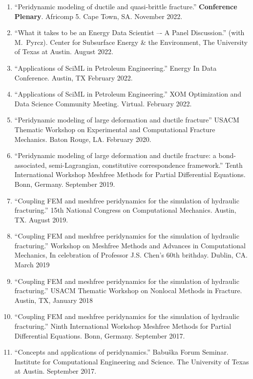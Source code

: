 \else
%
\ifdefined\ispdf
\begin{etaremune}
\else
\begin{enumerate}
\fi
    \item ``Peridynamic modeling of ductile and quasi-brittle fracture.''  {\bf Conference Plenary}. Africomp 5. Cape Town, SA.  November 2022.
    \item ``What it takes to be an Energy Data Scientist –- A Panel Discussion.'' (with M.\ Pyrcz). Center for Subsurface Energy \& the Environment, The University of Texas at Austin.  August 2022.
    \item ``Applications of SciML in Petroleum Engineering.'' Energy In Data Conference. Austin, TX February 2022.
    \item ``Applications of SciML in Petroleum Engineering.'' XOM Optimization and Data Science Community Meeting.  Virtual. February 2022.
    \item ``Peridynamic modeling of large deformation and ductile fracture'' USACM Thematic Workshop on Experimental and Computational Fracture Mechanics. Baton Rouge, LA. February 2020.
    \item ``Peridynamic modeling of large deformation and ductile fracture: a bond-associated, semi-Lagrangian, constitutive correspondence framework.'' Tenth International Workshop Meshfree Methods for Partial Differential Equations. Bonn, Germany. September 2019.
    \item ``Coupling FEM and meshfree peridynamics for the simulation of hydraulic fracturing.'' 15th National Congress on Computational Mechanics. Austin, TX. August 2019.
    \item ``Coupling FEM and meshfree peridynamics for the simulation of hydraulic fracturing.'' Workshop on Meshfree Methods and Advances in Computational Mechanics, In celebration of Professor J.S. Chen's 60th brithday.  Dublin, CA.  March 2019
    \item ``Coupling FEM and meshfree peridynamics for the simulation of hydraulic fracturing.'' USACM Thematic Workshop on Nonlocal Methods in Fracture.  Austin, TX, January 2018
    \item ``Coupling FEM and meshfree peridynamics for the simulation of hydraulic fracturing.'' Ninth International Workshop Meshfree Methods for Partial Differential Equations. Bonn, Germany. September 2017.
    \item ``Concepts and applications of peridynamics.'' Babu\v{s}ka Forum Seminar. Institute for Computational Engineering and Science. The University of Texas at Austin. September 2017.

\end{enumerate}
\end{etaremune}
